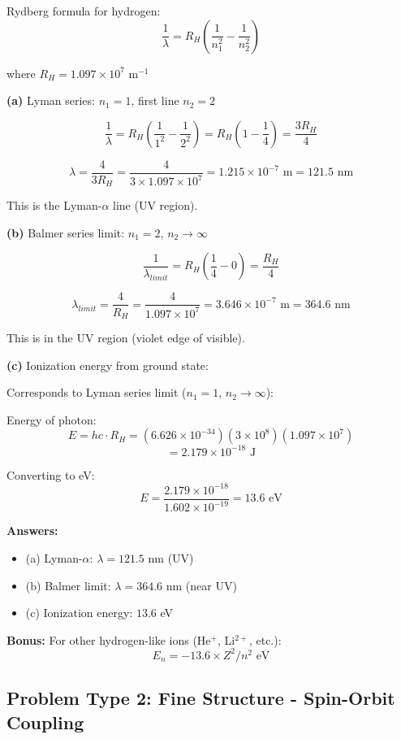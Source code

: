 \documentclass[12pt,a4paper]{article}
\begin{document}
\begin{solution}
Rydberg formula for hydrogen:
$$\frac{1}{\lambda} = R_H\left(\frac{1}{n_1^2} - \frac{1}{n_2^2}\right)$$

where $R_H = 1.097 \times 10^7$ m$^{-1}$

\textbf{(a)} Lyman series: $n_1 = 1$, first line $n_2 = 2$

$$\frac{1}{\lambda} = R_H\left(\frac{1}{1^2} - \frac{1}{2^2}\right) = R_H\left(1 - \frac{1}{4}\right) = \frac{3R_H}{4}$$

$$\lambda = \frac{4}{3R_H} = \frac{4}{3 \times 1.097 \times 10^7} = 1.215 \times 10^{-7}\text{ m} = 121.5\text{ nm}$$

This is the Lyman-$\alpha$ line (UV region).

\textbf{(b)} Balmer series limit: $n_1 = 2$, $n_2 \to \infty$

$$\frac{1}{\lambda_{limit}} = R_H\left(\frac{1}{4} - 0\right) = \frac{R_H}{4}$$

$$\lambda_{limit} = \frac{4}{R_H} = \frac{4}{1.097 \times 10^7} = 3.646 \times 10^{-7}\text{ m} = 364.6\text{ nm}$$

This is in the UV region (violet edge of visible).

\textbf{(c)} Ionization energy from ground state:

Corresponds to Lyman series limit ($n_1 = 1$, $n_2 \to \infty$):

Energy of photon:
$$E = hc \cdot R_H = (6.626 \times 10^{-34})(3 \times 10^8)(1.097 \times 10^7)$$
$$= 2.179 \times 10^{-18}\text{ J}$$

Converting to eV:
$$E = \frac{2.179 \times 10^{-18}}{1.602 \times 10^{-19}} = 13.6\text{ eV}$$

\textbf{Answers:}
\begin{itemize}
    \item (a) Lyman-$\alpha$: $\lambda = 121.5$ nm (UV)
    \item (b) Balmer limit: $\lambda = 364.6$ nm (near UV)
    \item (c) Ionization energy: $13.6$ eV
\end{itemize}

\textbf{Bonus:} For other hydrogen-like ions (He$^+$, Li$^{2+}$, etc.):
$$E_n = -13.6 \times Z^2 / n^2\text{ eV}$$
\end{solution}

\subsection{Problem Type 2: Fine Structure - Spin-Orbit Coupling}
\end{document}
